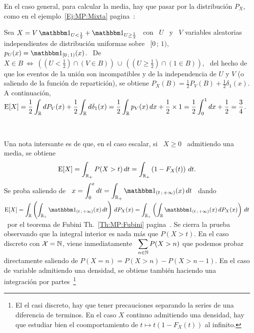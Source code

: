 {En el caso general, para calcular  la media, hay que pasar por la distribuci\'on
$P_X$, como en el ejemplo~\ref{Ej:MP:Mixta}  pagina~\pageref{Ej:MP:Mixta}:
%
\begin{ejemplo}\label{Ej:MP:EspMixta}
  Sea $X = V \,  \un_{U < \frac12} + \un_{U \ge \frac12}$ \ con  \ $U$ \ y \ $V$
  variables aleatorias independientes de distribuci\'on uniformas sobre \ $[0 \,
  ;  \, 1)$,  \ie  $p_U(x) =  \un_{[0  \, ;  \,  1)}(x)$. \  De \  $X  \in B  \:
  \Leftrightarrow  \: \left(  \left( U  < \frac12  \right) \cap  \left( V  \in B
    \right) \right) \, \cup \, \left( \left( U \ge \frac12 \right) \cap \left( 1
      \in B \right) \right)$,  \ del hecho de que los eventos  de la uni\'on son
  incompatibles y de  la independencia de $U$ y $V$ (o  saliendo de la funci\'on
  de repartici\'on), se obtiene $P_X(B) = \frac12 P_V(B) + \frac12 \delta_1(x)$.
  A  continuaci\'on, \  $\displaystyle \operatorname{E}[X]  = \frac12  \int_{\mathbb{R}}  dP_V(x) +
  \frac12 \int_{\mathbb{R}}  d\delta_1(x) = \frac12  \int_{\mathbb{R}} p_V(x) \, dx  + \frac12
  \times 1 = \frac12 \int_0^1 dx + \frac12 = \frac34$.
\end{ejemplo}

\

Una nota intersante es  de que, en el caso escalar, si \  $X \ge 0$ \ admitiendo
una media, se obtiene
%
\[
\operatorname{E}[X]  = \int_{\mathbb{R}_+} P(X  > t)  \, dt  = \int_{\mathbb{R}_+}  \left( 1  - F_X(t)
\right) \, dt.
\]
%
Se proba saliendo  de \ $\displaystyle x = \int_0^x  dt = \int_{\Rset_+} \un_{(t
  \, ;  \, +\infty)}(x)  \, dt$  \ dando \  $\displaystyle \Esp[X]  = \int_\Rset
\left( \int_{\Rset_+}  \un_{(t \, ; \,  +\infty)}(x) \, dt \right)  \, dP_X(x) =
\int_{\Rset_+} \left( \int_\Rset \un_{(t \, ; \, +\infty)}(x) \, dP_X(x) \right)
\,    dt$    \    por    el    teorema    de    Fubini    Th.~\ref{Th:MP:Fubini}
pagina~\pageref{Th:MP:Fubini}. Se  cierra la  prueba observando que  la integral
interior es nada  m\'as que $P(X > t)$.   En el caso discreto con  $\mathcal{X} = \mathbb{N}$,
viene  inmediatamente \ $\displaystyle  \sum_{n \in  \mathbb{N}} P(X>n)$  que podemos
probar directamente  saliendo de $P(X  = n) =  P(X>n)- P(X>n-1)$. En el  caso de
variable   admitiendo  una   densidad,   se  obtiene   tambi\'en  haciendo   una
integraci\'on  por   partes~\footnote{El  el   casi  discreto,  hay   que  tener
  precauciones separando la series de una diferencia de terminos. En el caso $X$
  continuo admitiendo una densidad, hay  que estudiar bien el coomportamiento de
  $t \mapsto t (1-F_X(t))$ al infinito.}

}
